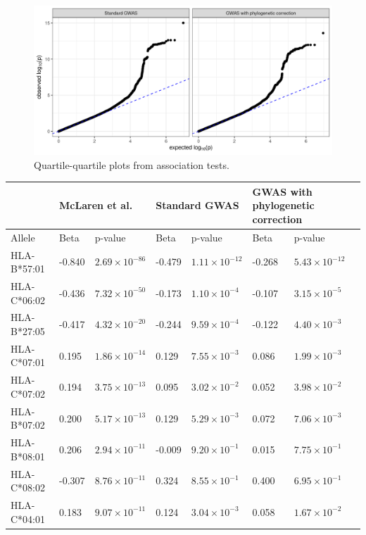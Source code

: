 \documentclass[]{article}
\begin{document}
\begin{doublespace}
\begin{figure}[H]
	\centering
	\includegraphics[width=0.75\linewidth]{figures/200207_qq_plots.png}
	\caption{Quartile-quartile plots from association tests.}
	\label{fig:qq-plots}
\end{figure}

\newpage
\begin{longtable}[H]{p{3cm}p{1cm}p{2cm}p{1cm}p{2cm}p{1cm}p{2cm}} %
		\hline
		& \multicolumn{2}{l}{McLaren et al.}  & \multicolumn{2}{l}{Standard GWAS} & \multicolumn{2}{l}{GWAS with phylogenetic correction} \\ 
		\hline
	 	Allele & Beta & p-value & Beta &p-value & Beta& p-value \\ 
		\hline
		HLA-B*57:01 & -0.840 & $2.69 \times 10^{-86}$ & -0.479 & $1.11 \times 10^{-12}$ & -0.268 & $5.43 \times 10^{-12}$ \\ 
		HLA-C*06:02 & -0.436 & $7.32 \times 10^{-50}$ & -0.173 & $1.10 \times 10^{-4}$ & -0.107 & $3.15 \times 10^{-5}$ \\ 
		HLA-B*27:05 & -0.417 & $4.32 \times 10^{-20}$ & -0.244 & $9.59 \times 10^{-4}$ & -0.122 & $4.40 \times 10^{-3}$ \\ 
		HLA-C*07:01 & 0.195 & $1.86 \times 10^{-14}$ & 0.129 & $7.55 \times 10^{-3}$ & 0.086 & $1.99 \times 10^{-3}$ \\ 
		HLA-C*07:02 & 0.194 & $3.75 \times 10^{-13}$ & 0.095 & $3.02 \times 10^{-2}$ & 0.052 & $3.98 \times 10^{-2}$ \\ 
		HLA-B*07:02 & 0.200 & $5.17 \times 10^{-13}$ & 0.129 & $5.29 \times 10^{-3}$ & 0.072 & $7.06 \times 10^{-3}$ \\ 
		HLA-B*08:01 & 0.206 & $2.94 \times 10^{-11}$ & -0.009 & $9.20 \times 10^{-1}$ & 0.015 & $7.75 \times 10^{-1}$ \\ 
		HLA-C*08:02 & -0.307 & $8.76 \times 10^{-11}$ & 0.324 & $8.55 \times 10^{-1}$ & 0.400 & $6.95 \times 10^{-1}$ \\ 
		HLA-C*04:01 & 0.183 & $9.07 \times 10^{-11}$ & 0.124 & $3.04 \times 10^{-3}$ & 0.058 & $1.67 \times 10^{-2}$ \\ 

\end{longtable}
\end{doublespace}
\end{document}
